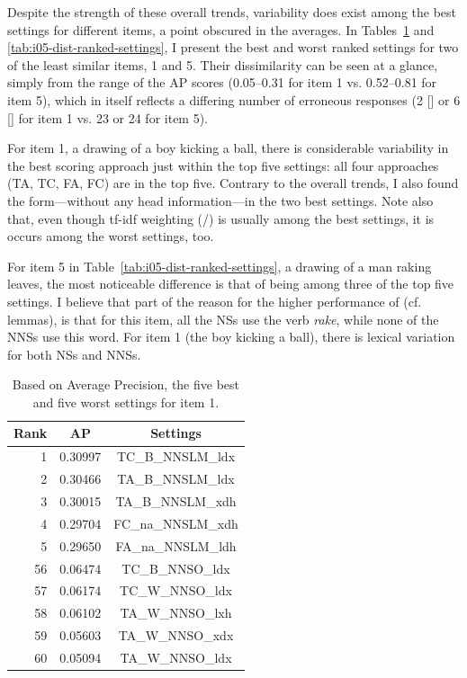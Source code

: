 Despite the strength of these overall trends, variability
does exist among the best settings for different items, a point obscured
in the averages.  In Tables~\ref{tab:i01-dist-ranked-settings} and
\ref{tab:i05-dist-ranked-settings}, I present the best and worst
ranked settings for two of the least similar items, 1 and 5.
Their dissimilarity can be seen at a glance, simply from the range of
the AP scores (0.05--0.31 for item 1 vs. 0.52--0.81 for item 5), which
in itself reflects a differing number of erroneous responses (2 []
or 6 [] for item 1 vs. 23 or 24 for item 5).

For item 1, a drawing of a boy kicking a ball, there is considerable
variability in the best scoring approach just within the top five settings:
all four approaches (TA, TC, FA, FC) are in the top five.  Contrary to the overall
trends, I also found the  form---without any head
information---in the two best settings.  Note also that, even though
tf-idf weighting (/) is usually among the best settings, it is
occurs among the worst settings, too.

For item 5 in Table~\ref{tab:i05-dist-ranked-settings}, a drawing of a
man raking leaves, the most noticeable difference is that
of  being among three of the top five settings.
I believe that part of the reason for
the higher performance of  (cf. lemmas), is that for this
item, all the NSs use the verb \textit{rake}, while none of the NNSs use this word.  For item 1 (the boy kicking a ball), there is lexical variation
for both NSs and NNSs.

\begin{table}[htb!]
\begin{center}
\begin{tabular}{|r|c|c|}
\hline
Rank & AP & Settings \\
\hline
\hline
1 & 0.30997 & TC\_B\_NNSLM\_ldx \\
\hline
2 & 0.30466 & TA\_B\_NNSLM\_ldx \\
\hline
3 & 0.30015 & TA\_B\_NNSLM\_xdh \\
\hline
4 & 0.29704 & FC\_na\_NNSLM\_xdh \\
\hline
5 & 0.29650 & FA\_na\_NNSLM\_ldh \\
\hline
\hline
56 & 0.06474 & TC\_B\_NNSO\_ldx \\
\hline
57 & 0.06174 & TC\_W\_NNSO\_ldx \\
\hline
58 & 0.06102 & TA\_W\_NNSO\_lxh \\
\hline
59 & 0.05603 & TA\_W\_NNSO\_xdx \\
\hline
60 & 0.05094 & TA\_W\_NNSO\_ldx \\
\hline
\end{tabular}
\caption{Based on Average Precision, the five best and five worst settings for item 1.}
\label{tab:i01-dist-ranked-settings}
\end{center}
\end{table}

